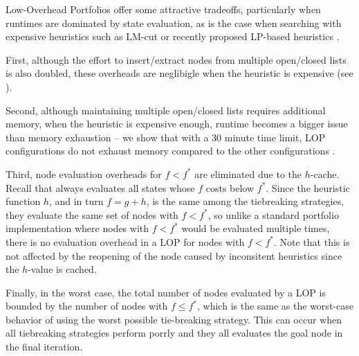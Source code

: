 Low-Overhead Portfolios offer some attractive tradeoffs,
particularly when runtimes are dominated by state evaluation, as is the case when searching with 
expensive heuristics such as LM-cut or recently proposed LP-based heuristics \cite{Pommereningetal14}.

First, although the effort to insert/extract nodes from multiple open/closed lists is also doubled, these overheads
are neglibigle when the heuristic is expensive (see ).

Second, although maintaining multiple open/closed lists requires additional memory,
when the heuristic is expensive enough, runtime becomes a bigger issue than memory exhaustion  -- we show that with a 30 minute time limit, LOP configurations do not exhaust memory compared to the other configurations .

Third, node evaluation overheads for $f < f^*$ are eliminated due to the $h$-cache.
Recall that \astar always evaluates all states whose $f$ costs 
below $f^*$. Since the heuristic function $h$, and in turn $f=g+h$, is
the same among the tiebreaking strategies, they evaluate the same set of
nodes with $f<f^*$, so unlike a standard portfolio implementation where 
nodes with $f<f^*$ would be evaluated multiple times, there is no evaluation overhead in a LOP
for nodes with $f<f^*$.
Note that this is not
affected by the reopening of the node caused by inconsitent heuristics
since the $h$-value is cached.


Finally, in the worst case, the total number of nodes evaluated by a LOP is bounded by the number of nodes with $f \leq f^*$, which is the same as the worst-case behavior of \astar using the worst possible tie-breaking strategy.
This can occur  when all tiebreaking
strategies perform porrly  and they all evaluates the goal node in the
final iteration.

